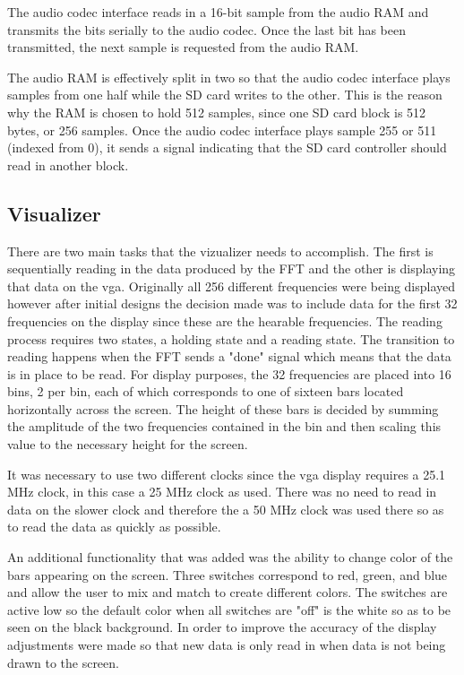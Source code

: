 \documentclass{article}
\begin{document}
The audio codec interface reads in a 16-bit sample from the audio RAM and
transmits the bits serially to the audio codec. Once the last bit has been
transmitted, the next sample is requested from the audio RAM.

The audio RAM is effectively split in two so that the audio codec interface
plays samples from one half while the SD card writes to the other. This is
the reason why the RAM is chosen to hold 512 samples, since one SD card
block is 512 bytes, or 256 samples. Once the audio codec interface plays 
sample 255 or 511 (indexed from 0), it sends a signal indicating that the 
SD card controller should read in another block.

\subsection{Visualizer} 

There are two main tasks that the vizualizer needs to accomplish.  
The first is sequentially reading in the data produced by the FFT and the 
other is displaying that data on the vga.  Originally all 256 different 
frequencies were being displayed however after initial designs the decision 
made was to include data for the first 32 frequencies on the display since 
these are the hearable frequencies.  The reading process requires two states, 
a holding state and a reading state.  The transition to reading happens when 
the FFT sends a "done" signal which means that the data is in place to be read.  
For display purposes, the 32 frequencies are placed into 16 bins, 2 per bin, 
each of which corresponds to one of sixteen bars located horizontally across 
the screen.  The height of these bars is decided by summing the amplitude of 
the two frequencies contained in the bin and then scaling this value to the 
necessary height for the screen.

It was necessary to use two different clocks since the vga display requires a 25.1 MHz clock, in this case a 25 MHz clock as used.  There was no need to read in data on the slower clock and therefore the a 50 MHz clock was used there so as to read the data as quickly as possible. 

An additional functionality that was added was the ability to change color of the bars appearing on the screen.  
Three switches correspond to red, green, and blue and allow the user to mix 
and match to create different colors.  The switches are active low so the 
default color when all switches are "off" is the white so as to be seen on the 
black background.  In order to improve the accuracy of the display adjustments 
were made so that new data is only read in when data is not being drawn to the screen.
\end{document}

